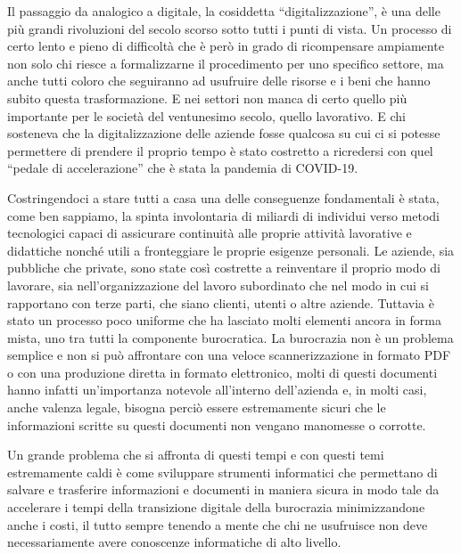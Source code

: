 Il passaggio da analogico a digitale, la cosiddetta “digitalizzazione”, è una delle più grandi
rivoluzioni del secolo scorso sotto tutti i punti di vista. Un processo di certo lento e pieno
di difficoltà che è però in grado di ricompensare ampiamente non solo chi riesce a
formalizzarne il procedimento per uno specifico settore, ma anche tutti coloro che
seguiranno ad usufruire delle risorse e i beni che hanno subito questa trasformazione.
E nei settori non manca di certo quello più importante per le società del ventunesimo secolo,
quello lavorativo. E chi sosteneva che la digitalizzazione delle aziende fosse qualcosa su cui
ci si potesse permettere di prendere il proprio tempo è stato costretto a ricredersi con quel
“pedale di accelerazione” che è stata la pandemia di COVID-19.

Costringendoci a stare tutti a casa una delle conseguenze fondamentali è stata,
come ben sappiamo, la spinta involontaria
di miliardi di individui verso metodi tecnologici capaci di assicurare continuità alle proprie
attività lavorative e didattiche nonché utili a fronteggiare le proprie esigenze personali.
Le aziende, sia pubbliche che private, sono state così costrette a reinventare il proprio modo
di lavorare, sia nell'organizzazione del lavoro subordinato che nel modo in cui si rapportano
con terze parti, che siano clienti, utenti o altre aziende. Tuttavia è stato un processo poco
uniforme che ha lasciato molti elementi ancora in forma mista,
uno tra tutti la componente burocratica. 
La burocrazia non è un problema semplice e non si può affrontare con una veloce
scannerizzazione in formato PDF o con una produzione diretta
in formato elettronico, molti di questi documenti hanno infatti un'importanza notevole
all'interno dell'azienda e, in molti casi, anche valenza legale, bisogna perciò essere
estremamente sicuri che le informazioni scritte su questi documenti
non vengano manomesse o corrotte.

Un grande problema che si affronta di questi tempi e con questi temi estremamente
caldi è come sviluppare strumenti informatici che permettano di salvare e trasferire
informazioni e documenti in maniera sicura in modo tale da accelerare i tempi della
transizione digitale della burocrazia minimizzandone anche i costi, il tutto sempre
tenendo a mente che chi ne usufruisce non deve necessariamente avere conoscenze informatiche
di alto livello.

